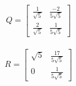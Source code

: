 \documentclass[a4paper,12pt]{article}
\begin{document}
\paragraph{\begin{equation}
		Q=
		\begin{bmatrix}
			\frac{1}{\sqrt{5}} & \frac{-2}{5\sqrt{5}}\\
			\frac{2}{\sqrt{5}} & \frac{1}{5\sqrt{5}}
		\end{bmatrix}
\end{equation}}
\paragraph{\begin{equation}
		R=
		\begin{bmatrix}
			\sqrt{5} & \frac{17}{5\sqrt{5}}\\
			0 & \frac{1}{5\sqrt{5}}
		\end{bmatrix}
\end{equation}}
\end{document}
